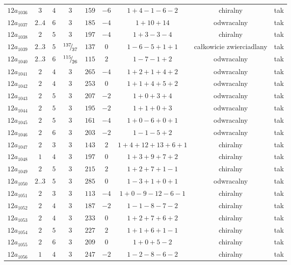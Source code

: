 \begin{longtable}{ccccccccc}
$12a_{1036}$ & $3$ & $4$ & $3$ & $159$ & $-6$ & $1+4-1-6-2$ & chiralny & tak \\
$12a_{1037}$ & $2..4$ & $6$ & $3$ & $185$ & $-4$ & $1+10+14$ & odwracalny & tak \\
$12a_{1038}$ & $2$ & $5$ & $3$ & $197$ & $-4$ & $1+3-3-4$ & chiralny & tak \\
$12a_{1039}$ & $2..3$ & $5$ & ${}^{137}{\mskip -5mu/\mskip -3mu}_{37}$ & $137$ & $0$ & $1-6-5+1+1$ & całkowicie zwierciadlany & tak \\
$12a_{1040}$ & $2..3$ & $6$ & ${}^{115}{\mskip -5mu/\mskip -3mu}_{26}$ & $115$ & $2$ & $1-7-1+2$ & odwracalny & tak \\
$12a_{1041}$ & $2$ & $4$ & $3$ & $265$ & $-4$ & $1+2+1+4+2$ & odwracalny & tak \\
$12a_{1042}$ & $2$ & $4$ & $3$ & $253$ & $0$ & $1+1+4+5+2$ & odwracalny & tak \\
$12a_{1043}$ & $2$ & $5$ & $3$ & $207$ & $-2$ & $1+0+3+4$ & odwracalny & tak \\
$12a_{1044}$ & $2$ & $5$ & $3$ & $195$ & $-2$ & $1+1+0+3$ & odwracalny & tak \\
$12a_{1045}$ & $2$ & $5$ & $3$ & $161$ & $-4$ & $1+0-6+0+1$ & odwracalny & tak \\
$12a_{1046}$ & $2$ & $6$ & $3$ & $203$ & $-2$ & $1-1-5+2$ & odwracalny & tak \\
$12a_{1047}$ & $2$ & $3$ & $3$ & $143$ & $2$ & $1+4+12+13+6+1$ & chiralny & tak \\
$12a_{1048}$ & $1$ & $4$ & $3$ & $197$ & $0$ & $1+3+9+7+2$ & chiralny & tak \\
$12a_{1049}$ & $2$ & $5$ & $3$ & $215$ & $2$ & $1+2+7+1-1$ & chiralny & tak \\
$12a_{1050}$ & $2..3$ & $5$ & $3$ & $285$ & $0$ & $1-3+1+0+1$ & odwracalny & tak \\
$12a_{1051}$ & $2$ & $3$ & $3$ & $113$ & $-4$ & $1+0-9-12-6-1$ & chiralny & tak \\
$12a_{1052}$ & $2$ & $4$ & $3$ & $187$ & $-2$ & $1-1-8-7-2$ & chiralny & tak \\
$12a_{1053}$ & $2$ & $4$ & $3$ & $233$ & $0$ & $1+2+7+6+2$ & chiralny & tak \\
$12a_{1054}$ & $2$ & $5$ & $3$ & $227$ & $2$ & $1+1+6+1-1$ & chiralny & tak \\
$12a_{1055}$ & $2$ & $6$ & $3$ & $209$ & $0$ & $1+0+5-2$ & chiralny & tak \\
$12a_{1056}$ & $1$ & $4$ & $3$ & $247$ & $-2$ & $1-2-8-6-2$ & chiralny & tak \\

\end{longtable}
